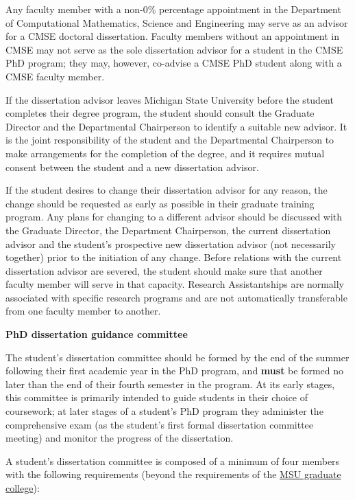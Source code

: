 Any faculty member with a non-0\% percentage appointment in the
Department of Computational Mathematics, Science and Engineering may
serve as an advisor for a CMSE doctoral dissertation.  Faculty members
without an appointment in CMSE may not serve as the sole dissertation
advisor for a student in the CMSE PhD program; they may, however,
co-advise a CMSE PhD student along with a CMSE faculty member.

If the dissertation advisor leaves Michigan State University before the
student completes their degree program, the student should consult
the Graduate Director and the Departmental Chairperson to identify a
suitable new advisor.  It is the joint responsibility of the
student and the Departmental Chairperson to make arrangements for the
completion of the degree, and it requires mutual consent between the
student and a new dissertation advisor.

If the student desires to change their dissertation advisor for any
reason, the change should be requested as early as possible in their
graduate training program.  Any plans for changing to a different
advisor should be discussed with the Graduate Director, the Department
Chairperson, the current dissertation advisor and the student's
prospective new dissertation advisor (not necessarily together) prior
to the initiation of any change.  Before relations with the current
dissertation advisor are severed, the student should make sure that
another faculty member will serve in that capacity.  Research
Assistantships are normally associated with specific research programs
and are not automatically transferable from one faculty member to
another.

\vspace{3mm}
\noindent
\textbf{PhD dissertation guidance committee}

The student's dissertation committee should be formed by the end of the
summer following their first academic year in the PhD program, and
\textbf{must} be formed no later than the end of their fourth semester
in the program. At its early stages, this committee is primarily
intended to guide students in their choice of coursework; at later
stages of a student's PhD program they administer the comprehensive
exam (as the student's first formal dissertation committee meeting) and
monitor the progress of the dissertation.  

A student's dissertation committee is composed of a minimum of four
members with the following requirements (beyond the requirements of
the \href{https://hr.msu.edu/documents/facacadhandbooks/facultyhandbook/composition.htm}{MSU graduate
college}):

